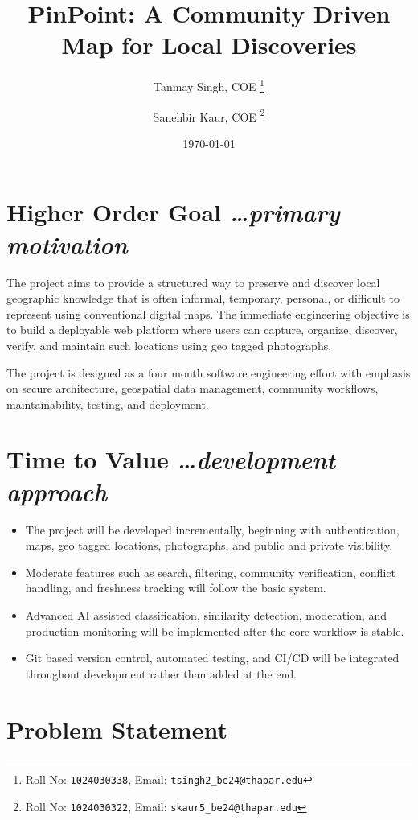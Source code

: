 \documentclass[11pt,a4paper]{article}
\title{PinPoint: A Community Driven Map for Local Discoveries}
\author{
  Tanmay Singh, COE%
  \thanks{Roll No: \texttt{1024030338},
  Email: \texttt{tsingh2\_be24@thapar.edu}}
  \and
  Sanehbir Kaur, COE%
  \thanks{Roll No: \texttt{1024030322},
  Email: \texttt{skaur5\_be24@thapar.edu}}
}
\date{\today}
\newcommand{\BvrHint}[1]{%
  {\normalfont\normalsize\itshape\hfill #1}}
\begin{document}
\maketitle

\section{Higher Order Goal%
  \BvrHint{\ldots primary motivation}}

The project aims to provide a structured way to preserve and discover local
geographic knowledge that is often informal, temporary, personal, or difficult
to represent using conventional digital maps. The immediate engineering
objective is to build a deployable web platform where users can capture,
organize, discover, verify, and maintain such locations using geo tagged
photographs.

The project is designed as a four month software engineering effort with
emphasis on secure architecture, geospatial data management, community
workflows, maintainability, testing, and deployment.

\section{Time to Value%
  \BvrHint{\ldots development approach}}

\begin{itemize}[leftmargin=0.7cm]
    \item The project will be developed incrementally, beginning with
    authentication, maps, geo tagged locations, photographs, and
    public and private visibility.
    
    \item Moderate features such as search, filtering, community verification,
    conflict handling, and freshness tracking will follow the basic system.
    
    \item Advanced AI assisted classification, similarity detection,
    moderation, and production monitoring will be implemented after the core
    workflow is stable.
    
    \item Git based version control, automated testing, and CI/CD will be
    integrated throughout development rather than added at the end.
\end{itemize}

\section{Problem Statement}
\end{document}
